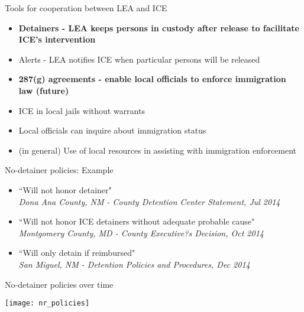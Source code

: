 \documentclass[xcolor=pdftex,dvipsnames,table,handout]{beamer}
\begin{document}
\begin{frame}{Tools for cooperation between LEA and ICE}
\begin{itemize}
\item \textbf{Detainers - LEA keeps persons in custody after release to facilitate ICE's intervention}\vspace{0.10cm}
\item Alerts - LEA notifies ICE when particular persons will be released\vspace{0.10cm}
\item \textbf{287(g) agreements - enable local officials to enforce immigration law (future)}\vspace{0.10cm}
\item ICE in local jails without warrants\vspace{0.10cm}
\item Local officials can inquire about immigration status\vspace{0.10cm}
\item (in general)  Use of local resources in assisting with immigration enforcement
\end{itemize}
\end{frame}

\begin{frame}{No-detainer policies: Example}
\pause
\begin{itemize}
\item ``Will not honor detainer" \\\vspace{0.1cm}
\footnotesize{\textit{Dona Ana County, NM - County Detention Center Statement, Jul 2014}}  \vspace{0.3cm}\pause
\item \normalsize{``Will not honor ICE detainers without adequate probable cause"} \\ \vspace{0.1cm}
\footnotesize{\textit{Montgomery County, MD - County Executive?s Decision, Oct 2014}}  \vspace{0.3cm}\pause
\item \normalsize{``Will only detain if reimbursed"} \\ \vspace{0.1cm}
\footnotesize{\textit{San Miguel, NM - Detention Policies and Procedures, Dec 2014}}
\end{itemize}
\end{frame}

\begin{frame}{No-detainer policies over time}
\begin{center}
\texttt{[image: nr\_policies]}
\end{center}
\end{frame}
\end{document}
